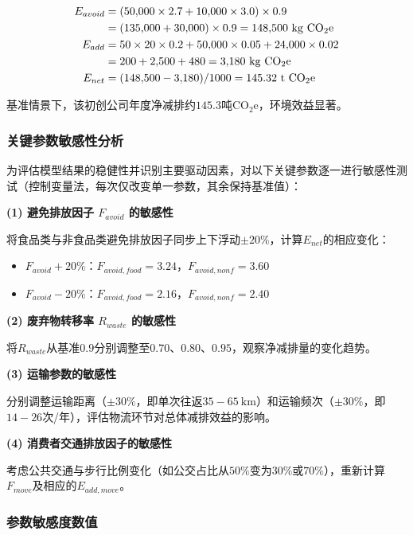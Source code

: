 \documentclass{article}
\begin{document}
\begin{align}
E_{avoid} &= (50{,}000 \times 2.7 + 10{,}000 \times 3.0) \times 0.9 \notag\\
          &= (135{,}000 + 30{,}000) \times 0.9 = 148{,}500\ \mathrm{kg\ CO_2e} \\
E_{add}   &= 50 \times 20 \times 0.2 + 50{,}000 \times 0.05 + 24{,}000 \times 0.02 \notag\\
          &= 200 + 2{,}500 + 480 = 3{,}180\ \mathrm{kg\ CO_2e} \\
E_{net}   &= (148{,}500 - 3{,}180) / 1000 = 145.32\ \mathrm{t\ CO_2e}
\end{align}

基准情景下，该初创公司年度净减排约$145.3$吨$\mathrm{CO_2e}$，环境效益显著。


\subsubsection{关键参数敏感性分析}

为评估模型结果的稳健性并识别主要驱动因素，对以下关键参数逐一进行敏感性测试（控制变量法，每次仅改变单一参数，其余保持基准值）：

\textbf{(1) 避免排放因子 $F_{avoid}$ 的敏感性}

将食品类与非食品类避免排放因子同步上下浮动$\pm 20\%$，计算$E_{net}$的相应变化：
\begin{itemize}
    \item $F_{avoid} +20\%$：$F_{avoid,food}=3.24$，$F_{avoid,nonf}=3.60$
    \item $F_{avoid} -20\%$：$F_{avoid,food}=2.16$，$F_{avoid,nonf}=2.40$
\end{itemize}

\textbf{(2) 废弃物转移率 $R_{waste}$ 的敏感性}

将$R_{waste}$从基准$0.9$分别调整至$0.70$、$0.80$、$0.95$，观察净减排量的变化趋势。

\textbf{(3) 运输参数的敏感性}

分别调整运输距离（$\pm 30\%$，即单次往返$35-65\ \mathrm{km}$）和运输频次（$\pm 30\%$，即$14-26$次/年），评估物流环节对总体减排效益的影响。

\textbf{(4) 消费者交通排放因子的敏感性}

考虑公共交通与步行比例变化（如公交占比从$50\%$变为$30\%$或$70\%$），重新计算$F_{move}$及相应的$E_{add,move}$。

\subsubsection{参数敏感度数值}
\end{document}
